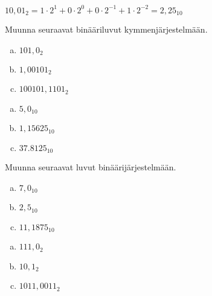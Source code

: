 \begin{esimerkki}
$10,01_2 = 1 \cdot 2^1 + 0 \cdot 2^0 + 0 \cdot 2^{-1} + 1 \cdot 2^{-2} = 2,25_{10}$
\end{esimerkki}

\begin{tehtava}
Muunna seuraavat binääriluvut kymmenjärjestelmään.
	\begin{enumerate}[a)]
		\item $101,0_2$
		\item $1,00101_2$
		\item $100101,1101_2$
	\end{enumerate}
\begin{vastaus}
	\begin{enumerate}[a)]
		\item $5,0_{10}$
		\item $1,15625_{10}$
		\item $37.8125_{10}$
	\end{enumerate}
\end{vastaus}
\end{tehtava}

\begin{tehtava}
Muunna seuraavat luvut binäärijärjestelmään.
	\begin{enumerate}[a)]
		\item $7,0_{10}$
		\item $2,5_{10}$
		\item $11,1875_{10}$
	\end{enumerate}
\begin{vastaus}
	\begin{enumerate}[a)]
		\item $111,0_2$
		\item $10,1_2$
		\item $1011,0011_2$
	\end{enumerate}
\end{vastaus}
\end{tehtava}

